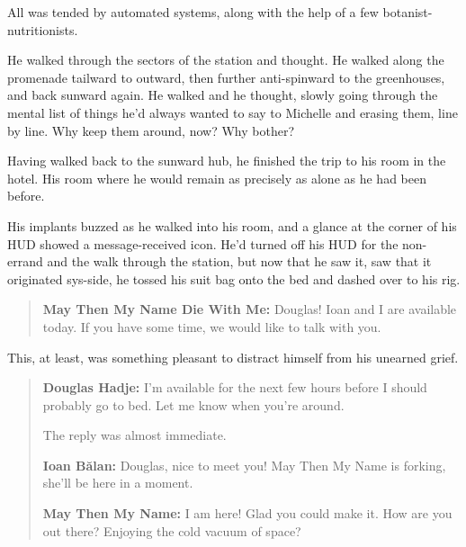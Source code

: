 All was tended by automated systems, along with the help of a few botanist-nutritionists.

He walked through the sectors of the station and thought. He walked along the promenade tailward to outward, then further anti-spinward to the greenhouses, and back sunward again. He walked and he thought, slowly going through the mental list of things he'd always wanted to say to Michelle and erasing them, line by line. Why keep them around, now? Why bother?

Having walked back to the sunward hub, he finished the trip to his room in the hotel. His room where he would remain as precisely as alone as he had been before.

His implants buzzed as he walked into his room, and a glance at the corner of his HUD showed a message-received icon. He'd turned off his HUD for the non-errand and the walk through the station, but now that he saw it, saw that it originated sys-side, he tossed his suit bag onto the bed and dashed over to his rig.

\begin{quote}
\textbf{May Then My Name Die With Me:} Douglas! Ioan and I are available today. If you have some time, we would like to talk with you.
\end{quote}

This, at least, was something pleasant to distract himself from his unearned grief.

\begin{quote}
\textbf{Douglas Hadje:} I'm available for the next few hours before I should probably go to bed. Let me know when you're around.

The reply was almost immediate.

\textbf{Ioan Bălan:} Douglas, nice to meet you! May Then My Name is forking, she'll be here in a moment.

\textbf{May Then My Name:} I am here! Glad you could make it. How are you out there? Enjoying the cold vacuum of space?
\end{quote}

